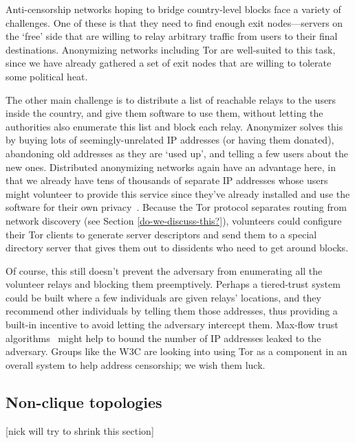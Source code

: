 \documentclass{llncs}
\begin{document}
Anti-censorship networks hoping to bridge country-level blocks face
a variety of challenges. One of these is that they need to find enough
exit nodes---servers on the `free' side that are willing to relay
arbitrary traffic from users to their final destinations. Anonymizing
networks including Tor are well-suited to this task, since we have
already gathered a set of exit nodes that are willing to tolerate some
political heat.

The other main challenge is to distribute a list of reachable relays
to the users inside the country, and give them software to use them,
without letting the authorities also enumerate this list and block each
relay. Anonymizer solves this by buying lots of seemingly-unrelated IP
addresses (or having them donated), abandoning old addresses as they are
`used up', and telling a few users about the new ones. Distributed
anonymizing networks again have an advantage here, in that we already
have tens of thousands of separate IP addresses whose users might
volunteer to provide this service since they've already installed and use
the software for their own privacy~\cite{koepsell:wpes2004}. Because
the Tor protocol separates routing from network discovery (see Section
\ref{do-we-discuss-this?}), volunteers could configure their Tor clients
to generate server descriptors and send them to a special directory
server that gives them out to dissidents who need to get around blocks.

Of course, this still doesn't prevent the adversary
from enumerating all the volunteer relays and blocking them preemptively.
Perhaps a tiered-trust system could be built where a few individuals are
given relays' locations, and they recommend other individuals by telling them
those addresses, thus providing a built-in incentive to avoid letting the
adversary intercept them. Max-flow trust algorithms~\cite{advogato}
might help to bound the number of IP addresses leaked to the adversary. Groups
like the W3C are looking into using Tor as a component in an overall system to
help address censorship; we wish them luck.


\subsection{Non-clique topologies}

[nick will try to shrink this section]
\end{document}
